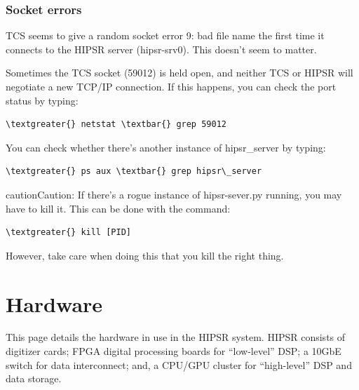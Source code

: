 \documentclass[letterpaper,10pt,english]{sphinxmanual}
\begin{document}
\subsection{Socket errors}
\label{user_guide:socket-errors}
TCS seems to give a random socket error 9: bad file name the first time
it connects to the HIPSR server (hipsr-srv0). This doesn't seem to matter.

Sometimes the TCS socket (59012) is held open, and neither TCS or HIPSR will negotiate
a new TCP/IP connection. If this happens, you can check the port status by typing:

\begin{Verbatim}[commandchars=\\\{\}]
\textgreater{} netstat \textbar{} grep 59012
\end{Verbatim}

You can check whether there's another instance of hipsr\_server by typing:

\begin{Verbatim}[commandchars=\\\{\}]
\textgreater{} ps aux \textbar{} grep hipsr\_server
\end{Verbatim}

\begin{notice}{caution}{Caution:}
If there's a rogue instance of hipsr-sever.py running, you may have to kill it.
This can be done with the command:

\begin{Verbatim}[commandchars=\\\{\}]
\textgreater{} kill [PID]
\end{Verbatim}

However, take care when doing this that you kill the right thing.
\end{notice}


\chapter{Hardware}
\label{hardware:hardware-chapter}\label{hardware:hardware}\label{hardware:telescope-user-guide}\label{hardware::doc}
This page details the hardware in use in the HIPSR system. HIPSR consists of digitizer
cards; FPGA digital processing boards for ``low-level'' DSP; a 10GbE switch for data
interconnect; and, a CPU/GPU cluster for ``high-level'' DSP and data storage.
\end{document}
